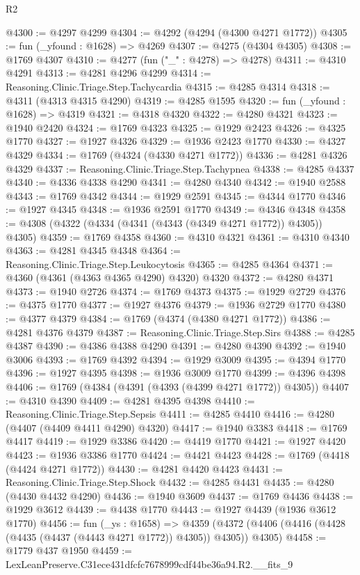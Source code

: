 \begin{lexlean}{R2}
\begin{coremodule}
@4300 := @4297 @4299
@4304 := @4292 (@4294 (@4300 @4271 @1772))
@4305 := fun (_yfound : @1628) => @4269
@4307 := @4275 (@4304 @4305)
@4308 := @1769 @4307
@4310 := @4277 (fun ("_" : @4278) => @4278)
@4311 := @4310 @4291
@4313 := @4281 @4296 @4299
@4314 := Reasoning.Clinic.Triage.Step.Tachycardia
@4315 := @4285 @4314
@4318 := @4311 (@4313 @4315 @4290)
@4319 := @4285 @1595
@4320 := fun (_yfound : @1628) => @4319
@4321 := @4318 @4320
@4322 := @4280 @4321
@4323 := @1940 @2420
@4324 := @1769 @4323
@4325 := @1929 @2423
@4326 := @4325 @1770
@4327 := @1927 @4326
@4329 := @1936 @2423 @1770
@4330 := @4327 @4329
@4334 := @1769 (@4324 (@4330 @4271 @1772))
@4336 := @4281 @4326 @4329
@4337 := Reasoning.Clinic.Triage.Step.Tachypnea
@4338 := @4285 @4337
@4340 := @4336 @4338 @4290
@4341 := @4280 @4340
@4342 := @1940 @2588
@4343 := @1769 @4342
@4344 := @1929 @2591
@4345 := @4344 @1770
@4346 := @1927 @4345
@4348 := @1936 @2591 @1770
@4349 := @4346 @4348
@4358 := @4308 (@4322 (@4334 (@4341 (@4343 (@4349 @4271 @1772)) @4305)) @4305)
@4359 := @1769 @4358
@4360 := @4310 @4321
@4361 := @4310 @4340
@4363 := @4281 @4345 @4348
@4364 := Reasoning.Clinic.Triage.Step.Leukocytosis
@4365 := @4285 @4364
@4371 := @4360 (@4361 (@4363 @4365 @4290) @4320) @4320
@4372 := @4280 @4371
@4373 := @1940 @2726
@4374 := @1769 @4373
@4375 := @1929 @2729
@4376 := @4375 @1770
@4377 := @1927 @4376
@4379 := @1936 @2729 @1770
@4380 := @4377 @4379
@4384 := @1769 (@4374 (@4380 @4271 @1772))
@4386 := @4281 @4376 @4379
@4387 := Reasoning.Clinic.Triage.Step.Sirs
@4388 := @4285 @4387
@4390 := @4386 @4388 @4290
@4391 := @4280 @4390
@4392 := @1940 @3006
@4393 := @1769 @4392
@4394 := @1929 @3009
@4395 := @4394 @1770
@4396 := @1927 @4395
@4398 := @1936 @3009 @1770
@4399 := @4396 @4398
@4406 := @1769 (@4384 (@4391 (@4393 (@4399 @4271 @1772)) @4305))
@4407 := @4310 @4390
@4409 := @4281 @4395 @4398
@4410 := Reasoning.Clinic.Triage.Step.Sepsis
@4411 := @4285 @4410
@4416 := @4280 (@4407 (@4409 @4411 @4290) @4320)
@4417 := @1940 @3383
@4418 := @1769 @4417
@4419 := @1929 @3386
@4420 := @4419 @1770
@4421 := @1927 @4420
@4423 := @1936 @3386 @1770
@4424 := @4421 @4423
@4428 := @1769 (@4418 (@4424 @4271 @1772))
@4430 := @4281 @4420 @4423
@4431 := Reasoning.Clinic.Triage.Step.Shock
@4432 := @4285 @4431
@4435 := @4280 (@4430 @4432 @4290)
@4436 := @1940 @3609
@4437 := @1769 @4436
@4438 := @1929 @3612
@4439 := @4438 @1770
@4443 := @1927 @4439 (@1936 @3612 @1770)
@4456 := fun (_ys : @1658) =>
  @4359 (@4372 (@4406 (@4416 (@4428 (@4435 (@4437 (@4443 @4271 @1772)) @4305)) @4305)) @4305)
@4458 := @1779 @437 @1950
@4459 := LexLeanPreserve.C31ece431dfcfc7678999cdf44be36a94.R2.__fits_9

\end{coremodule}
\end{lexlean}
